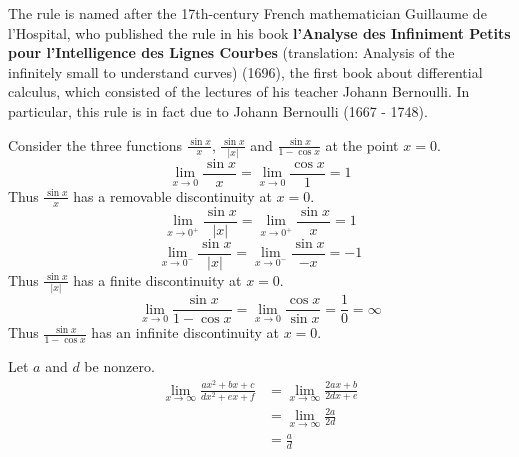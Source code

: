 The rule is named after the 17th-century French mathematician 
Guillaume de l'Hospital, who published the rule in his book 
{\bf l'Analyse des Infiniment Petits pour l'Intelligence des Lignes Courbes}
(translation: Analysis of the infinitely small to understand curves) (1696), 
the first book about differential calculus, which consisted of the lectures 
of his teacher Johann Bernoulli. In particular, this rule is in fact due to
Johann Bernoulli (1667 - 1748).

\begin{example}
{\rm
  Consider the three functions $\frac{\sin x}{x}$, $\frac{\sin x}{|x|}$ and
  $\frac{\sin x}{1 - \cos x}$ at the point $x = 0$.
  \[
  \lim_{x \to 0} \frac{\sin x}{x}
  = \lim_{x \to 0} \frac{\cos x}{1} 
  = 1
  \]
  Thus $\frac{\sin x}{x}$ has a removable discontinuity at $x = 0$.
  \[
  \lim_{x \to 0^+} \frac{\sin x}{|x|}
  = \lim_{x \to 0^+} \frac{\sin x}{x} = 1
  \]
  \[
  \lim_{x \to 0^-} \frac{\sin x}{|x|}
  = \lim_{x \to 0^-} \frac{\sin x}{-x} = -1
  \]
  Thus $\frac{\sin x}{|x|}$ has a finite discontinuity at $x = 0$.
  \[
  \lim_{x \to 0} \frac{\sin x}{1 - \cos x}
  = \lim_{x \to 0} \frac{\cos x}{\sin x}
  = \frac{1}{0} = \infty
  \]
  Thus $\frac{\sin x}{1 - \cos x}$ has an infinite discontinuity at $x = 0$.
}
\end{example}




\begin{example}
{\rm
  Let $a$ and $d$ be nonzero.
  \begin{align*}
    \lim_{x \to \infty} \frac{a x^2 + b x + c}{d x^2 + e x + f}
    &= \lim_{x \to \infty} \frac{2 a x + b}{2 d x + e} \\
    &= \lim_{x \to \infty} \frac{2 a}{2 d} \\
    &= \frac{a}{d}
  \end{align*}
}
\end{example}






